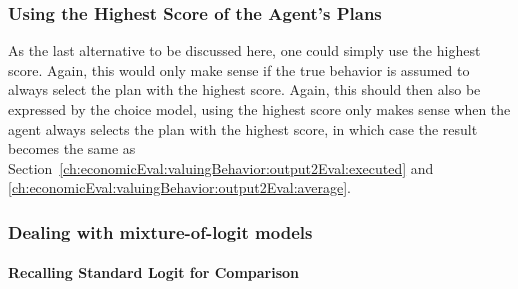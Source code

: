 



\subsubsection{Using the Highest Score of the Agent's Plans}
As the last alternative to be discussed here, one could simply use the highest score.  Again, this would only make sense if the true behavior is assumed to always select the plan with the highest score.  Again, this should then also be expressed by the choice model, \ie using the highest score only makes sense when the agent always selects the plan with the highest score, in which case the result becomes the same as Section~\ref{ch:economicEval:valuingBehavior:output2Eval:executed} and \ref{ch:economicEval:valuingBehavior:output2Eval:average}.

\subsubsection{Dealing with mixture-of-logit models}

\paragraph{Recalling Standard Logit for Comparison}

